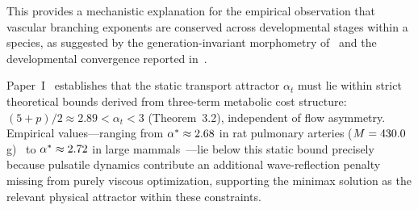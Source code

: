 \begin{remark}
This provides a mechanistic explanation for the empirical observation that
vascular branching exponents are conserved across developmental stages within a
species, as suggested by the generation-invariant morphometry
of~\cite{kassab1993} and the developmental convergence reported
in~\cite{forjaz2026}.
\end{remark}

\begin{remark}
Paper~I~\cite{paperI} establishes that the static transport attractor $\alpha_t$
must lie within strict theoretical bounds derived from three-term metabolic cost
structure: $(5+p)/2 \approx 2.89 < \alpha_t < 3$ (Theorem~3.2), independent of
flow asymmetry. Empirical values---ranging from $\alpha^* \approx
2.68$ in rat pulmonary arteries ($M=430.0\,$g)~\cite{jiang1994}
to $\alpha^* \approx 2.72$ in large mammals~\cite{kassab1993}---lie
below this static bound precisely because pulsatile dynamics contribute an
additional wave-reflection penalty missing from purely viscous optimization,
supporting the minimax solution as the relevant physical attractor within
these constraints.
\end{remark}

